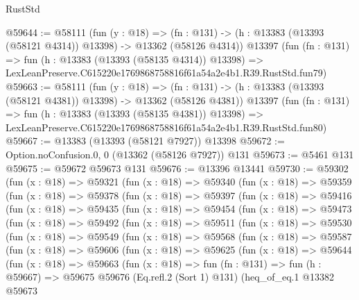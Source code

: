 \begin{lexlean}{RustStd}
\begin{coremodule}
@59644 := @58111
    (fun (y : @18) =>
    (fn : @131) -> (h : @13383 (@13393 (@58121 @4314)) @13398) -> @13362 (@58126 @4314))
    @13397
    (fun (fn : @131) =>
    fun (h : @13383 (@13393 (@58135 @4314)) @13398) =>
    LexLeanPreserve.C615220e1769868758816f61a54a2e4b1.R39.RustStd.fun79)
@59663 := @58111
    (fun (y : @18) =>
    (fn : @131) -> (h : @13383 (@13393 (@58121 @4381)) @13398) -> @13362 (@58126 @4381))
    @13397
    (fun (fn : @131) =>
    fun (h : @13383 (@13393 (@58135 @4381)) @13398) =>
    LexLeanPreserve.C615220e1769868758816f61a54a2e4b1.R39.RustStd.fun80)
@59667 := @13383 (@13393 (@58121 @7927)) @13398
@59672 := Option.noConfusion.{0, 0} (@13362 (@58126 @7927)) @131
@59673 := @5461 @131
@59675 := @59672 @59673 @131
@59676 := @13396 @13441
@59730 := @59302
    (fun (x : @18) =>
    @59321
      (fun (x : @18) =>
      @59340
        (fun (x : @18) =>
        @59359
          (fun (x : @18) =>
          @59378
            (fun (x : @18) =>
            @59397
              (fun (x : @18) =>
              @59416
                (fun (x : @18) =>
                @59435
                  (fun (x : @18) =>
                  @59454
                    (fun (x : @18) =>
                    @59473
                      (fun (x : @18) =>
                      @59492
                        (fun (x : @18) =>
                        @59511
                          (fun (x : @18) =>
                          @59530
                            (fun (x : @18) =>
                            @59549
                              (fun (x : @18) =>
                              @59568
                                (fun (x : @18) =>
                                @59587
                                  (fun (x : @18) =>
                                  @59606
                                    (fun (x : @18) =>
                                    @59625
                                      (fun (x : @18) =>
                                      @59644
                                        (fun (x : @18) =>
                                        @59663
                                          (fun (x : @18) =>
                                          fun (fn : @131) =>
                                          fun (h : @59667) =>
                                          @59675
                                            @59676
                                            (Eq.refl.{2} (Sort 1) @131)
                                            (heq_of_eq.{1}
                                              @13382
                                              @59673

\end{coremodule}
\end{lexlean}
